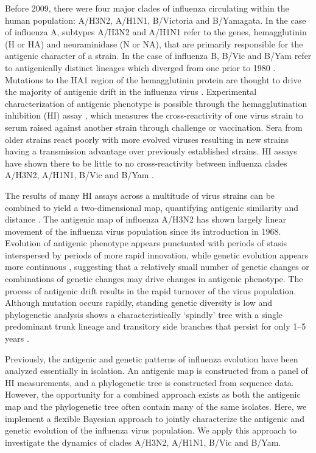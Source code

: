 \documentclass[11pt,oneside,letterpaper]{article}
\begin{document}
Before 2009, there were four major clades of influenza circulating within the human population: A/H3N2, A/H1N1, B/Victoria and B/Yamagata. 
In the case of influenza A, subtypes A/H3N2 and A/H1N1 refer to the genes, hemagglutinin (H or HA) and neuraminidase (N or NA), that are primarily responsible for the antigenic character of a strain. 
In the case of influenza B, B/Vic and B/Yam refer to antigenically distinct lineages which diverged from one prior to 1980 \cite{Rota92}.
Mutations to the HA1 region of the hemagglutinin protein are thought to drive the majority of antigenic drift in the influenza virus \cite{Nelson07NatRevGenet}. 
Experimental characterization of antigenic phenotype is possible through the hemagglutination inhibition (HI) assay \cite{Hirst43}, which measures the cross-reactivity of one virus strain to serum raised against another strain through challenge or vaccination. 
Sera from older strains react poorly with more evolved viruses resulting in new strains having a transmission advantage over previously established strains.
HI assays have shown there to be little to no cross-reactivity between influenza clades A/H3N2, A/H1N1, B/Vic and B/Yam \cite{Hay01}.

The results of many HI assays across a multitude of virus strains can be combined to yield a two-dimensional map, quantifying antigenic similarity and distance \cite{Smith04}. 
The antigenic map of influenza A/H3N2 has shown largely linear movement of the influenza virus population since its introduction in 1968. 
Evolution of antigenic phenotype appears punctuated with periods of stasis interspersed by periods of more rapid innovation, while genetic evolution appears more continuous \cite{Smith04}, suggesting that a relatively small number of genetic changes or combinations of genetic changes may drive changes in antigenic phenotype. 
The process of antigenic drift results in the rapid turnover of the virus population. 
Although mutation occurs rapidly, standing genetic diversity is low and phylogenetic analysis shows a characteristically `spindly' tree with a single predominant trunk lineage and transitory side branches that persist for only 1--5 years \cite{Fitch97}.

Previously, the antigenic and genetic patterns of influenza evolution have been analyzed essentially in isolation. 
An antigenic map is constructed from a panel of HI measurements, and a phylogenetic tree is constructed from sequence data. 
However, the opportunity for a combined approach exists as both the antigenic map and the phylogenetic tree often contain many of the same isolates. 
Here, we implement a flexible Bayesian approach to jointly characterize the antigenic and genetic evolution of the influenza virus population. 
We apply this approach to investigate the dynamics of clades A/H3N2, A/H1N1, B/Vic and B/Yam. 
\end{document}
